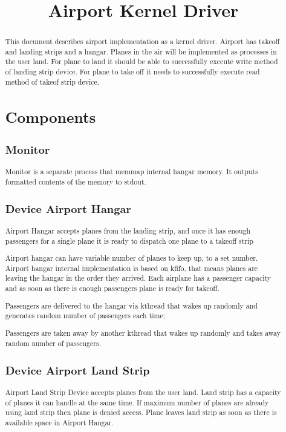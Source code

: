 \documentclass[10pt,a4paper]{article}
\begin{document}
\title{Airport Kernel Driver}
\maketitle

\begin{abstract}
This document describes airport implementation as a kernel driver. Airport has takeoff and landing strips and a hangar. Planes in the air will be implemented as processes in the user land. For plane to land it should be able to successfully execute write method of landing strip device. For plane to take off it needs to successfully execute read method of takeof strip device.

\tableofcontents

\section{Components}
\subsection{Monitor}
Monitor is a separate process that memmap internal hangar memory. It outputs formatted contents of the memory to stdout.

\subsection{Device Airport Hangar}
Airport Hangar accepts planes from the landing strip, and once it has enough passengers for a single plane it is ready to dispatch one plane to a takeoff strip

Airport hangar can have variable number of planes to keep up, to a set number. Airport hangar internal implementation is based on kfifo, that means planes are leaving the hangar in the order they arrived.
Each airplane has a passenger capacity and as soon as there is enough passengers plane is ready for takeoff.

Passengers are delivered to the hangar via kthread that wakes up randomly and generates random number of passengers each time;

Passengers are taken away by another kthread that wakes up randomly and takes away random number of passengers.

\subsection{Device Airport Land Strip}
Airport Land Strip Device accepts planes from the user land. Land strip has a capacity of planes it can handle at the same time. If maximum number of planes are already using land strip then plane is denied access. Plane leaves land strip as soon as there is available space in Airport Hangar.


\end{abstract}
\end{document}
